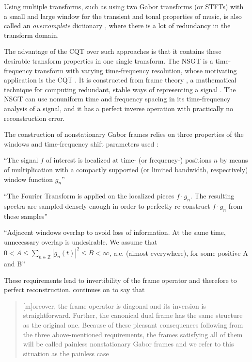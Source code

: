 \documentclass[report.tex]{subfiles}
\begin{document}
Using multiple transforms, such as using two Gabor transforms (or STFTs) with a small and large window for the transient and tonal properties of music, is also called an \textit{overcomplete} dictionary \parencite{dictionary}, where there is a lot of redundancy in the transform domain.

The advantage of the CQT over such approaches is that it contains these desirable transform properties in one single transform. The NSGT is a time-frequency transform with varying time-frequency resolution, whose motivating application is the CQT \parencite{jaillet, balazs}. It is constructed from frame theory \parencite{frametheory}, a mathematical technique for computing redundant, stable ways of representing a signal \parencite{framesintro}. The NSGT can use nonuniform time and frequency spacing in its time-frequency analysis of a signal, and it has a perfect inverse operation with practically no reconstruction error.

The construction of nonstationary Gabor frames relies on three properties of the windows and time-frequency shift parameters used \parencite[2]{balazs}:
\begin{tight_itemize}
	\item
		``The signal $f$ of interest is localized at time- (or frequency-) positions $n$ by means of multiplication with a compactly supported (or limited bandwidth, respectively) window function $g_{n}$''
	\item
		``The Fourier Transform is applied on the localized pieces $f \cdot g_{n}$. The resulting spectra are sampled densely enough in order to perfectly re-construct $f \cdot g_{n}$ from these samples''
	\item
		``Adjacent windows overlap to avoid loss of information. At the same time, unnecessary overlap is undesirable. We assume that $0 < A \le \sum_{n \in \mathbb{Z}}|g_{n}(t)|^{2} \le B < \infty$, a.e. (almost everywhere), for some positive A and B''
\end{tight_itemize}

These requirements lead to invertibility of the frame operator and therefore to perfect reconstruction. \citeauthor{balazs} continues on to say that

\begin{quote}
	[m]oreover, the frame operator is diagonal and its inversion is straightforward. Further, the canonical dual frame has the same structure as the original one. Because of these pleasant consequences following from the three above-mentioned requirements, the frames satisfying all of them will be called painless nonstationary Gabor frames and we refer to this situation as the painless case \parencite[1482]{balazs}
\end{quote}
\end{document}
